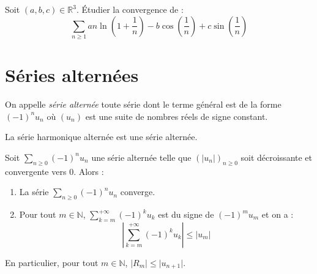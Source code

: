 \documentclass[a4paper,10pt]{report}
\newcommand{\Sum}[2]{\ensuremath{\textstyle{\sum\limits_{#1}^{#2}}}}
\begin{document}
\begin{exa} Soit $(a,b,c) \in \mathbb{R}^3$. Étudier la convergence de :
$$ \Sum{n \geq 1}{} a n \ln \left(1 + \frac{1}{n} \right) - b \cos \left( \frac{1}{n} \right) + c \sin \left( \frac{1}{n} \right)$$
\end{exa}

\section{Séries alternées}

\begin{defin} On appelle \textit{série alternée} toute série dont le terme général est de la forme $(-1)^n u_n$ où $(u_n)$ est une suite de nombres réels de signe constant.
\end{defin}

\begin{ex} La série harmonique alternée est une série alternée.
\end{ex}

\begin{thm}
Soit $\Sum{n \geq 0}{} (-1)^n u_n$ une série alternée telle que $(\vert u_n \vert)_{n \geq 0}$ soit décroissante et convergente vers $0$. Alors :
\begin{enumerate}
\item La série $\Sum{n \geq 0}{} (-1)^n u_n$ converge.
\item Pour tout $m \in \mathbb{N}$, $\Sum{k=m}{+ \infty} (-1)^k u_k$ est du signe de $(-1)^m u_m$ et on a :
$$ \left\vert \sum_{k=m}^{+ \infty} (-1)^k u_k \right\vert \leq \vert u_m \vert$$
\end{enumerate}
\end{thm}

\begin{rem} En particulier, pour tout $m \in \mathbb{N}$, $\vert R_m \vert \leq \vert u_{n+1} \vert$.
\end{rem}
\end{document}
